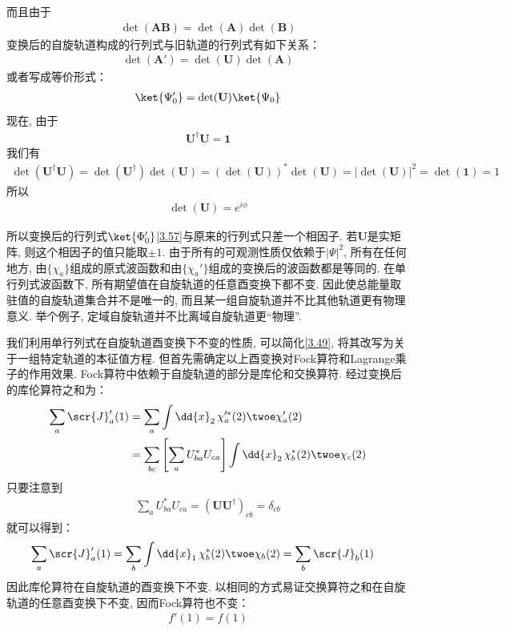 而且由于
\begin{align}
	\det(\mathbf{AB}) = \det(\mathbf{A})\det(\mathbf{B})
\end{align}
变换后的自旋轨道构成的行列式与旧轨道的行列式有如下关系：
\begin{align}
	\det(\mathbf{A}') = \det(\mathbf{U})\det(\mathbf{A})
\end{align}
或者写成等价形式：
\begin{align}
	\label{3.57}
	\ket{\Psi_0'} = \det(\mathbf{U})\ket{\Psi_0}
\end{align}
现在, 
由于
\begin{align}
	\mathbf{U}^\dagger\mathbf{U} = \mathbf{1}
\end{align}
我们有
\begin{align}
	\det(\mathbf{U}^\dagger\mathbf{U}) = \det(\mathbf{U}^\dagger)\det(\mathbf{U}) = (\det(\mathbf{U}))^*\det(\mathbf{U}) = |\det(\mathbf{U})|^2 = \det(\mathbf{1}) = 1
\end{align}
所以
\begin{align}
	\det(\mathbf{U}) = e^{i\phi}
\end{align}

所以变换后的行列式$\ket{\Phi_0'}$\autoref{3.57}与原来的行列式只差一个相因子. 
若$\mathbf{U}$是实矩阵, 
则这个相因子的值只能取$\pm 1$. 
由于所有的可观测性质仅依赖于$|\Psi|^2$, 
所有在任何地方, 
由$\{\chi_a\}$组成的原式波函数和由$\{\chi_a'\}$组成的变换后的波函数都是等同的. 
在单行列式波函数下, 
所有期望值在自旋轨道的任意酉变换下都不变. 
因此使总能量取驻值的自旋轨道集合并不是唯一的, 
而且某一组自旋轨道并不比其他轨道更有物理意义. 
举个例子, 
定域自旋轨道并不比离域自旋轨道更“物理”.


我们利用单行列式在自旋轨道酉变换下不变的性质, 
可以简化\autoref{3.49}, 
将其改写为关于一组特定轨道的本征值方程. 
但首先需确定以上酉变换对Fock算符和Lagrange乘子的作用效果. 
Fock算符中依赖于自旋轨道的部分是库伦和交换算符. 
经过变换后的库伦算符之和为：
\begin{align}
	\sum_a \scr{J}_a'(1) & = \sum_a\int\dd{x}_2\,\chi_a^{\prime*}(2)\twoe\chi_a'(2)\notag\\
	& = \sum_{bc}\left[ \sum_a U_{ba}^* U_{ca}\right]\int\dd{x}_2\,\chi_b^*(2)\twoe\chi_c(2)
\end{align}
只要注意到
\begin{align}
	\sum_a U_{ba}^* U_{ca} = (\mathbf{UU}^\dagger)_{cb} = \delta_{cb}
\end{align}
就可以得到：
\begin{align}
	\sum_a \scr{J}_a'(1) & = \sum_b\int\dd{x}_1\,\chi_b^{*}(2)\twoe\chi_b(2) = \sum_{b}\scr{J}_b(1)
\end{align}
因此库伦算符在自旋轨道的酉变换下不变. 
以相同的方式易证交换算符之和在自旋轨道的任意酉变换下不变, 
因而Fock算符也不变：
\begin{align}
	f'(1) = f(1)
\end{align}

